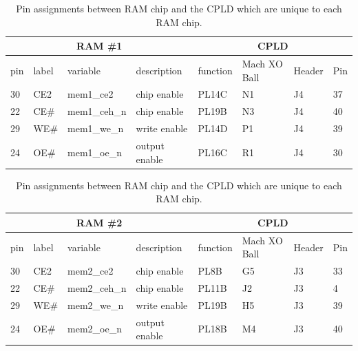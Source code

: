 \documentclass{article}
\begin{document}

\begin{table}
\center

\begin{tabular}{|l|l|l|l|l|l|l|l|}
    \hline
	\multicolumn{4}{|c|}{\textbf{RAM \#1}} & \multicolumn{4}{|c|}{\textbf{CPLD}} \\
	\hline
    pin & label & variable & description &  function & Mach XO Ball & Header & Pin \\
    \hline
    30 & CE2 & mem1\_ce2 & chip enable & PL14C & N1 & J4 & 37 \\
	\hline
    22 & CE\# & mem1\_ceh\_n & chip enable & PL19B & N3 & J4 & 40 \\
	\hline
    29 & WE\# & mem1\_we\_n & write enable & PL14D & P1 & J4 & 39 \\
	\hline
    24 & OE\# & mem1\_oe\_n & output enable & PL16C & R1 & J4 & 30 \\
	\hline
\end{tabular}

\vspace{5mm}  

\begin{tabular}{|l|l|l|l|l|l|l|l|}
    \hline
	\multicolumn{4}{|c|}{\textbf{RAM \#2}} & \multicolumn{4}{|c|}{\textbf{CPLD}} \\
	\hline
    pin & label & variable & description &  function & Mach XO Ball & Header & Pin \\
    \hline
    30 & CE2 & mem2\_ce2 & chip enable & PL8B & G5 & J3 & 33 \\
	\hline
    22 & CE\# & mem2\_ceh\_n & chip enable & PL11B & J2 & J3 & 4 \\
	\hline
    29 & WE\# & mem2\_we\_n & write enable & PL19B & H5 & J3 & 39 \\
	\hline
    24 & OE\# & mem2\_oe\_n & output enable & PL18B & M4 & J3 & 40 \\
	\hline
\end{tabular}

\caption{Pin assignments between RAM chip and the CPLD
which are unique to each RAM chip.}
\label{tbl:rampinsuniq}
\end{table}
\end{document}

